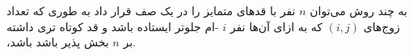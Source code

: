 \EXERCISE
به چند روش می‌توان
$n$
نفر با قد‌های متمایز را در یک صف قرار داد به طوری که تعداد زوج‌های
$(i, j)$
که به ازای آن‌ها نفر
$i$
-ام جلوتر ایستاده باشد و قد کوتاه تری داشته باشد‫‪،‬‬ بر
$n$
بخش پذیر باشد.